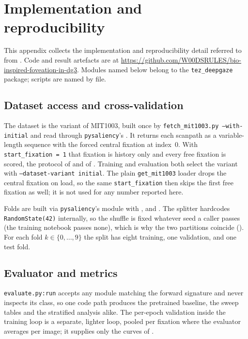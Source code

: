 \chapter{Implementation and reproducibility}
\label{app:impl}

This appendix collects the implementation and reproducibility detail referred to from .
Code and result artefacts are at \url{https://github.com/W00DSRULES/bio-inspired-foveation-in-dg3}.
Modules named below belong to the \texttt{tez\_deepgaze} package; scripts are named by file.

\section{Dataset access and cross-validation}
\label{app:data}

The dataset is the  variant of MIT1003, built once by
\texttt{fetch\_mit1003.py --with-initial} and read through \texttt{pysaliency}'s
. It returns each scanpath as a variable-length sequence with the
forced central fixation at index~$0$. With \texttt{start\_fixation = 1} that fixation is history only
and every free fixation is scored, the protocol of \citet{kummerer2022deepgaze3} and of .
Training and evaluation both select the variant with \texttt{--dataset-variant initial}. The plain
\texttt{get\_mit1003} loader drops the central fixation on load, so the same \texttt{start\_fixation}
then skips the first free fixation as well; it is not used for any number reported here.

Folds are built via \texttt{pysaliency}'s  module with
,  and .
The splitter hardcodes \texttt{RandomState(42)} internally, so the shuffle is fixed whatever seed a
caller passes (the \dg{} training notebook passes none), which is why the two
partitions coincide (). For each fold $k \in \{0, \ldots, 9\}$ the split has eight
training, one validation, and one test fold.

\section{Evaluator and metrics}
\label{app:eval}

\texttt{evaluate.py:run} accepts any module matching the \dg{} forward signature and never inspects its
class, so one code path produces the pretrained baseline, the sweep tables and the stratified analysis
alike. The per-epoch validation inside the training loop is a separate, lighter loop, pooled per fixation
where the evaluator averages per image; it supplies only the curves of .

